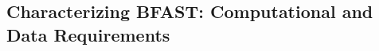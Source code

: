 \documentclass{cpeauth}
\begin{document}






\subsection{Characterizing BFAST: Computational and Data Requirements}


\begin{figure}
 \centering


\end{figure}
\end{document}
